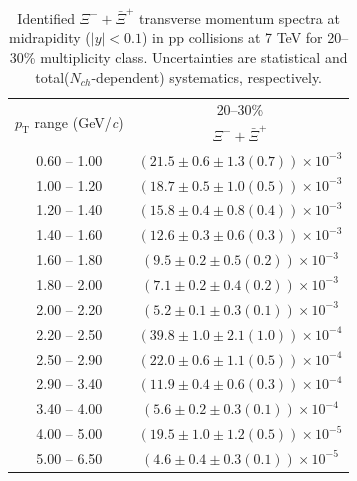 \begin{table}
\caption{Identified $\Xi^{-} + \bar{\Xi}^{+}$ transverse momentum spectra at midrapidity ($|y|<0.1$) in pp collisions at 7 TeV for 20--30\% multiplicity class. Uncertainties are statistical and total($N_{ch}$-dependent) systematics, respectively.}
\label{tab:XiSum_20to30}
\begin{center}
\begin{tabular}{ c | c }
\hline
\multirow{2}{*}{$p_{\mathrm{T}}$ range (GeV/\textit{c})} & \multicolumn{1}{c}{20--30\%} \\ & $\Xi^{-} + \bar{\Xi}^{+}$\\ 
\hline
0.60 -- 1.00 & $(21.5\pm0.6\pm1.3(0.7))\times10^{-3}$ \\ 
1.00 -- 1.20 & $(18.7\pm0.5\pm1.0(0.5))\times10^{-3}$ \\ 
1.20 -- 1.40 & $(15.8\pm0.4\pm0.8(0.4))\times10^{-3}$ \\ 
1.40 -- 1.60 & $(12.6\pm0.3\pm0.6(0.3))\times10^{-3}$ \\ 
1.60 -- 1.80 & $(9.5\pm0.2\pm0.5(0.2))\times10^{-3}$ \\ 
1.80 -- 2.00 & $(7.1\pm0.2\pm0.4(0.2))\times10^{-3}$ \\ 
2.00 -- 2.20 & $(5.2\pm0.1\pm0.3(0.1))\times10^{-3}$ \\ 
2.20 -- 2.50 & $(39.8\pm1.0\pm2.1(1.0))\times10^{-4}$ \\ 
2.50 -- 2.90 & $(22.0\pm0.6\pm1.1(0.5))\times10^{-4}$ \\ 
2.90 -- 3.40 & $(11.9\pm0.4\pm0.6(0.3))\times10^{-4}$ \\ 
3.40 -- 4.00 & $(5.6\pm0.2\pm0.3(0.1))\times10^{-4}$ \\ 
4.00 -- 5.00 & $(19.5\pm1.0\pm1.2(0.5))\times10^{-5}$ \\ 
5.00 -- 6.50 & $(4.6\pm0.4\pm0.3(0.1))\times10^{-5}$ \\ 
\hline
\end{tabular}
\end{center}
\end{table}
 
